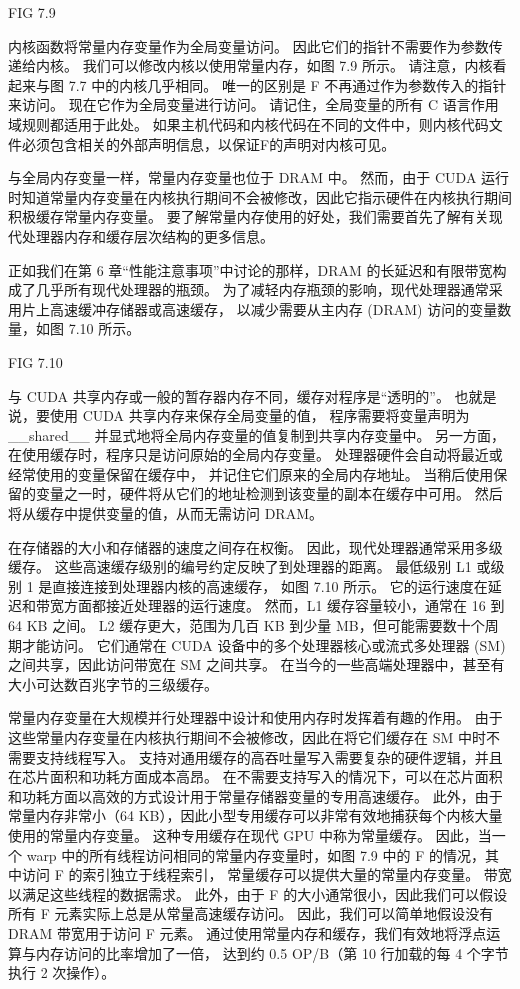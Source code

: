 {\color{red} FIG 7.9}

内核函数将常量内存变量作为全局变量访问。 因此它们的指针不需要作为参数传递给内核。 
我们可以修改内核以使用常量内存，如图 7.9 所示。 请注意，内核看起来与图 7.7 中的内核几乎相同。 
唯一的区别是 F 不再通过作为参数传入的指针来访问。 现在它作为全局变量进行访问。 
请记住，全局变量的所有 C 语言作用域规则都适用于此处。 
如果主机代码和内核代码在不同的文件中，则内核代码文件必须包含相关的外部声明信息，以保证F的声明对内核可见。

与全局内存变量一样，常量内存变量也位于 DRAM 中。 
然而，由于 CUDA 运行时知道常量内存变量在内核执行期间不会被修改，因此它指示硬件在内核执行期间积极缓存常量内存变量。 
要了解常量内存使用的好处，我们需要首先了解有关现代处理器内存和缓存层次结构的更多信息。

正如我们在第 6 章“性能注意事项”中讨论的那样，DRAM 的长延迟和有限带宽构成了几乎所有现代处理器的瓶颈。 
为了减轻内存瓶颈的影响，现代处理器通常采用片上高速缓冲存储器或高速缓存，
以减少需要从主内存 (DRAM) 访问的变量数量，如图 7.10 所示。

{\color{red} FIG 7.10}

与 CUDA 共享内存或一般的暂存器内存不同，缓存对程序是“透明的”。 
也就是说，要使用 CUDA 共享内存来保存全局变量的值，
程序需要将变量声明为 \_\_shared\_\_ 并显式地将全局内存变量的值复制到共享内存变量中。 
另一方面，在使用缓存时，程序只是访问原始的全局内存变量。 处理器硬件会自动将最近或经常使用的变量保留在缓存中，
并记住它们原来的全局内存地址。 当稍后使用保留的变量之一时，硬件将从它们的地址检测到该变量的副本在缓存中可用。 
然后将从缓存中提供变量的值，从而无需访问 DRAM。

在存储器的大小和存储器的速度之间存在权衡。 因此，现代处理器通常采用多级缓存。 
这些高速缓存级别的编号约定反映了到处理器的距离。 最低级别 L1 或级别 1 是直接连接到处理器内核的高速缓存，
如图 7.10 所示。 它的运行速度在延迟和带宽方面都接近处理器的运行速度。 
然而，L1 缓存容量较小，通常在 16 到 64 KB 之间。 
L2 缓存更大，范围为几百 KB 到少量 MB，但可能需要数十个周期才能访问。 
它们通常在 CUDA 设备中的多个处理器核心或流式多处理器 (SM) 之间共享，因此访问带宽在 SM 之间共享。 
在当今的一些高端处理器中，甚至有大小可达数百兆字节的三级缓存。

常量内存变量在大规模并行处理器中设计和使用内存时发挥着有趣的作用。 
由于这些常量内存变量在内核执行期间不会被修改，因此在将它们缓存在 SM 中时不需要支持线程写入。 
支持对通用缓存的高吞吐量写入需要复杂的硬件逻辑，并且在芯片面积和功耗方面成本高昂。 
在不需要支持写入的情况下，可以在芯片面积和功耗方面以高效的方式设计用于常量存储器变量的专用高速缓存。 
此外，由于常量内存非常小（64 KB），因此小型专用缓存可以非常有效地捕获每个内核大量使用的常量内存变量。 
这种专用缓存在现代 GPU 中称为常量缓存。 
因此，当一个 warp 中的所有线程访问相同的常量内存变量时，如图 7.9 中的 F 的情况，其中访问 F 的索引独立于线程索引，
常量缓存可以提供大量的常量内存变量。 带宽以满足这些线程的数据需求。 
此外，由于 F 的大小通常很小，因此我们可以假设所有 F 元素实际上总是从常量高速缓存访问。 
因此，我们可以简单地假设没有 DRAM 带宽用于访问 F 元素。 
通过使用常量内存和缓存，我们有效地将浮点运算与内存访问的比率增加了一倍，
达到约 0.5 OP/B（第 10 行加载的每 4 个字节执行 2 次操作）。

